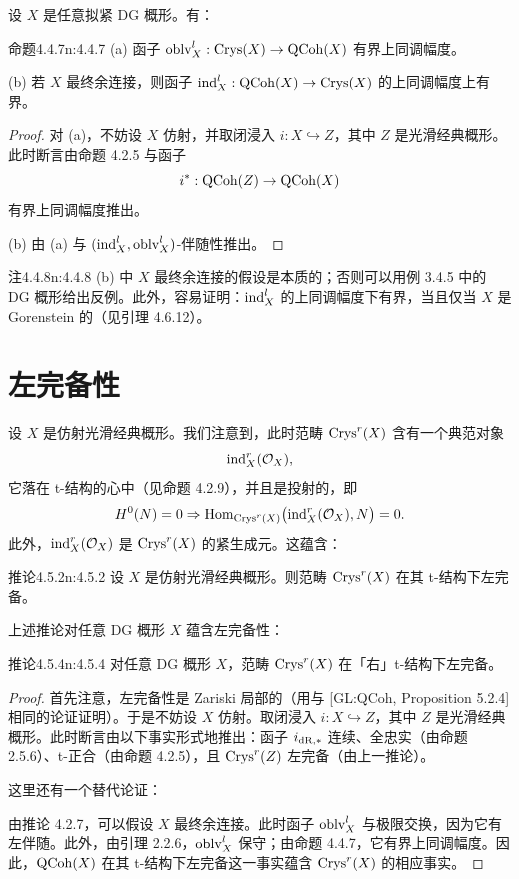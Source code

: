 设 $X$ 是任意拟紧 DG 概形。有：

\begin{othm}{命题}{4.4.7}{n:4.4.7}
(a) 函子 $\mathrm{oblv}^l_X:\mathrm{Crys}(X)\to\mathrm{QCoh}(X)$ 有界上同调幅度。

(b) 若 $X$ 最终余连接，则函子 $\mathrm{ind}^l_X:\mathrm{QCoh}(X)\to\mathrm{Crys}(X)$ 的上同调幅度上有界。
\end{othm}

\begin{proof}
对 (a)，不妨设 $X$ 仿射，并取闭浸入 $i:X\hookrightarrow Z$，其中 $Z$ 是光滑经典概形。此时断言由命题 4.2.5 与函子
\[
i^*:\mathrm{QCoh}(Z)\to\mathrm{QCoh}(X)
\]
有界上同调幅度推出。

(b) 由 (a) 与 $(\mathrm{ind}^l_X,\mathrm{oblv}^l_X)$-伴随性推出。
\end{proof}

\begin{othm}{注}{4.4.8}{n:4.4.8}
(b) 中 $X$ 最终余连接的假设是本质的；否则可以用例 3.4.5 中的 DG 概形给出反例。此外，容易证明：$\mathrm{ind}^l_X$ 的上同调幅度下有界，当且仅当 $X$ 是 Gorenstein 的（见引理 4.6.12）。
\end{othm}

\section{左完备性}

设 $X$ 是仿射光滑经典概形。我们注意到，此时范畴 $\mathrm{Crys}^r(X)$ 含有一个典范对象
\[
\mathrm{ind}^r_X(\mathcal{O}_X),
\]
它落在 t-结构的心中（见命题 4.2.9），并且是投射的，即
\[
H^0(N)=0\Rightarrow\mathrm{Hom}_{\mathrm{Crys}^r(X)}\big(\mathrm{ind}^r_X(\mathcal{O}_X),N\big)=0.
\]
此外，$\mathrm{ind}^r_X(\mathcal{O}_X)$ 是 $\mathrm{Crys}^r(X)$ 的紧生成元。这蕴含：

\begin{othm}{推论}{4.5.2}{n:4.5.2}
设 $X$ 是仿射光滑经典概形。则范畴 $\mathrm{Crys}^r(X)$ 在其 t-结构下左完备。
\end{othm}

上述推论对任意 DG 概形 $X$ 蕴含左完备性：

\begin{othm}{推论}{4.5.4}{n:4.5.4}
对任意 DG 概形 $X$，范畴 $\mathrm{Crys}^r(X)$ 在「右」t-结构下左完备。
\end{othm}

\begin{proof}
首先注意，左完备性是 Zariski 局部的（用与 [GL:QCoh, Proposition 5.2.4] 相同的论证证明）。于是不妨设 $X$ 仿射。取闭浸入 $i:X\hookrightarrow Z$，其中 $Z$ 是光滑经典概形。此时断言由以下事实形式地推出：函子 $i_{\mathrm{dR},*}$ 连续、全忠实（由命题 2.5.6）、t-正合（由命题 4.2.5），且 $\mathrm{Crys}^r(Z)$ 左完备（由上一推论）。

这里还有一个替代论证：

由推论 4.2.7，可以假设 $X$ 最终余连接。此时函子 $\mathrm{oblv}^l_X$ 与极限交换，因为它有左伴随。此外，由引理 2.2.6，$\mathrm{oblv}^l_X$ 保守；由命题 4.4.7，它有界上同调幅度。因此，$\mathrm{QCoh}(X)$ 在其 t-结构下左完备这一事实蕴含 $\mathrm{Crys}^r(X)$ 的相应事实。
\end{proof}

